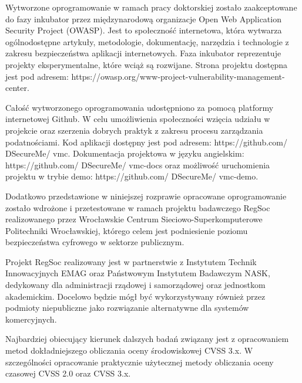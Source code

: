 \bigbreak
Wytworzone oprogramowanie w ramach pracy doktorskiej zostało zaakceptowane do fazy inkubator przez międzynarodową organizacje Open Web Application Security Project (OWASP). Jest to społeczność internetowa, która wytwarza ogólnodostępne artykuły, metodologie, dokumentację, narzędzia i technologie z zakresu bezpieczeństwa aplikacji internetowych. Faza inkubator reprezentuje projekty eksperymentalne, które wciąż są rozwijane. Strona projektu dostępna jest pod adresem: https://owasp.org/www-project-vulnerability-management-center.

\bigbreak
Całość wytworzonego oprogramowania udostępniono za pomocą platformy internetowej Github. W celu umożliwienia społeczności wzięcia udziału w projekcie oraz szerzenia dobrych praktyk z zakresu procesu zarządzania podatnościami. Kod aplikacji dostępny jest pod adresem: https://github.com/ DSecureMe/ vmc. Dokumentacja projektowa w języku angielskim: https://github.com/ DSecureMe/ vmc-docs oraz możliwość uruchomienia projektu w trybie demo: https://github.com/ DSecureMe/ vmc-demo.

\bigbreak
Dodatkowo przedstawione w niniejszej rozprawie opracowane oprogramowanie zostało wdrożone i przetestowane w ramach projektu badawczego RegSoc realizowanego przez Wrocławskie Centrum Sieciowo-Superkomputerowe Politechniki Wrocławskiej, którego celem jest podniesienie poziomu bezpieczeństwa cyfrowego w sektorze publicznym.

\bigbreak
Projekt RegSoc realizowany jest w partnerstwie z Instytutem Technik Innowacyjnych EMAG oraz Państwowym Instytutem Badawczym NASK, dedykowany dla administracji rządowej i samorządowej oraz jednostkom akademickim. Docelowo będzie mógł być wykorzystywany również przez podmioty niepubliczne jako rozwiązanie alternatywne dla systemów komercyjnych.

\bigbreak
Najbardziej obiecujący kierunek dalszych badań związany jest z opracowaniem  metod dokładniejszego obliczania oceny środowiskowej CVSS 3.x. W szczególności  opracowanie praktycznie użytecznej metody obliczania oceny czasowej CVSS 2.0 oraz CVSS 3.x. 
